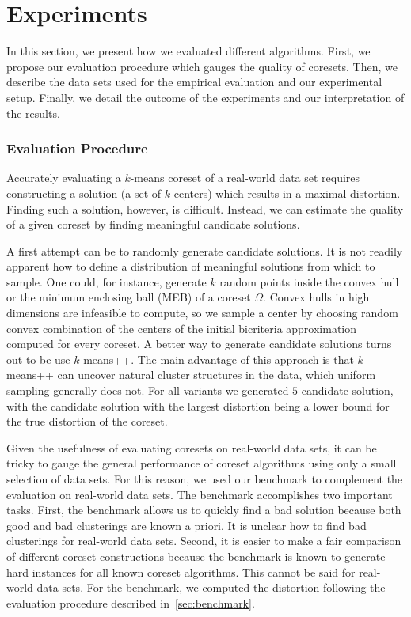 


\section{Experiments} \label{sec:experiments}
In this section, we present how we evaluated different algorithms. First, we propose our evaluation procedure which gauges the quality of coresets. Then, we describe the data sets used for the empirical evaluation and our experimental setup. Finally, we detail the outcome of the experiments and our interpretation of the results.

\subsubsection*{Evaluation Procedure}
\label{sec:evaluation-procedure}
Accurately evaluating a $k$-means coreset of a real-world data set requires constructing a solution (a set of $k$ centers) which results in a maximal distortion. Finding such a solution, however, is difficult. Instead, we can estimate the quality of a given coreset by finding meaningful candidate solutions. 

A first attempt can be to randomly generate candidate solutions. It is not readily apparent how to define a distribution of meaningful solutions from which to sample. One could, for instance, generate $k$ random points inside the convex hull or the minimum enclosing ball (MEB) of a coreset $\Omega$. Convex hulls in high dimensions are infeasible to compute, so we sample a center by choosing random convex combination of the centers of the initial bicriteria approximation computed for every coreset. 
A better way to generate candidate solutions turns out to be use $k$-means++. The main advantage of this approach is that $k$-means++ can uncover natural cluster structures in the data, which uniform sampling generally does not.
For all variants we generated $5$ candidate solution, with the candidate solution with the largest distortion being a lower bound for the true distortion of the coreset.

Given the usefulness of evaluating coresets on real-world data sets, it can be tricky to gauge the general performance of coreset algorithms using only a small selection of data sets. For this reason, we used our benchmark to complement the evaluation on real-world data sets. The benchmark accomplishes two important tasks. First, the benchmark allows us to quickly find a bad solution because both good and bad clusterings are known a priori. It is unclear how to find bad clusterings for real-world data sets. Second, it is easier to make a fair comparison of different coreset constructions because the benchmark is known to generate hard instances for all known coreset algorithms. This cannot be said for real-world data sets. For the benchmark, we computed the distortion following the evaluation procedure described in~\cref{sec:benchmark}. 

